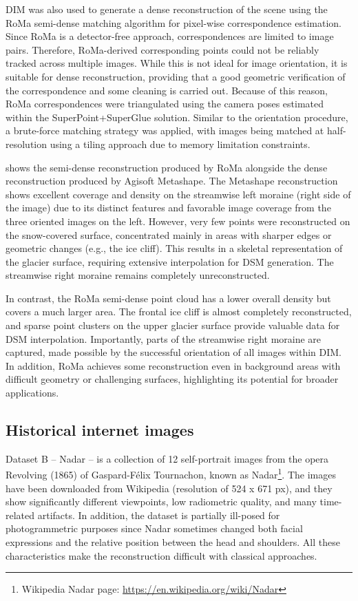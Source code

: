DIM was also used to generate a dense reconstruction of the scene using the RoMa semi-dense matching algorithm for pixel-wise correspondence estimation. 
Since RoMa is a detector-free approach, correspondences are limited to image pairs. 
Therefore, RoMa-derived corresponding points could not be reliably tracked across multiple images. 
While this is not ideal for image orientation, it is suitable for dense reconstruction, providing that a good geometric verification of the correspondence and some cleaning is carried out.
Because of this reason, RoMa correspondences were triangulated using the camera poses estimated within the SuperPoint+SuperGlue solution.
Similar to the orientation procedure, a brute-force matching strategy was applied, with images being matched at half-resolution using a tiling approach due to memory limitation constraints.

 shows the semi-dense reconstruction produced by RoMa alongside the dense reconstruction produced by Agisoft Metashape. 
The Metashape reconstruction shows excellent coverage and density on the streamwise left moraine (right side of the image) due to its distinct features and favorable image coverage from the three oriented images on the left. 
However, very few points were reconstructed on the snow-covered surface, concentrated mainly in areas with sharper edges or geometric changes (e.g., the ice cliff). 
This results in a skeletal representation of the glacier surface, requiring extensive interpolation for DSM generation. 
The streamwise right moraine remains completely unreconstructed.

In contrast, the RoMa semi-dense point cloud has a lower overall density but covers a much larger area. 
The frontal ice cliff is almost completely reconstructed, and sparse point clusters on the upper glacier surface provide valuable data for DSM interpolation. 
Importantly, parts of the streamwise right moraine are captured, made possible by the successful orientation of all images within DIM.  
In addition, RoMa achieves some reconstruction even in background areas with difficult geometry or challenging surfaces, highlighting its potential for broader applications.

\subsection{Historical internet images}

Dataset B – Nadar – is a collection of 12 self-portrait images from the opera Revolving (1865) of Gaspard-Félix Tournachon, known as Nadar\footnote{Wikipedia Nadar page: \url{https://en.wikipedia.org/wiki/Nadar}}. 
The images have been downloaded from Wikipedia (resolution of 524 x 671 px), and they show significantly different viewpoints, low radiometric quality, and many time-related artifacts. 
In addition, the dataset is partially ill-posed for photogrammetric purposes since Nadar sometimes changed both facial expressions and the relative position between the head and shoulders. 
All these characteristics make the reconstruction difficult with classical approaches.


